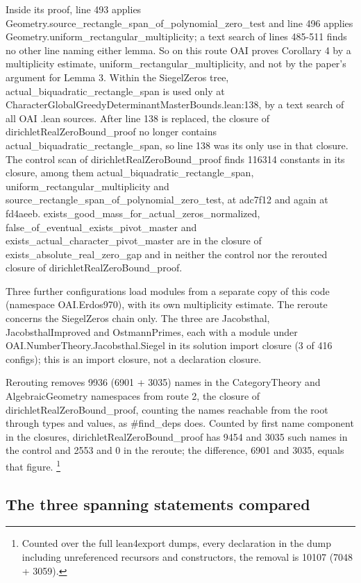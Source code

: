 Inside its proof, line 493 applies Geometry.source\_rectangle\_span\_of\_polynomial\_zero\_test and line 496 applies Geometry.uniform\_rectangular\_multiplicity; a text search of lines 485-511 finds no other line naming either lemma.
So on this route OAI proves Corollary 4 by a multiplicity estimate, uniform\_rectangular\_multiplicity, and not by the paper's argument for Lemma 3.
Within the SiegelZeros tree, actual\_biquadratic\_rectangle\_span is used only at CharacterGlobalGreedyDeterminantMasterBounds.lean:138, by a text search of all OAI .lean sources.
After line 138 is replaced, the closure of dirichletRealZeroBound\_proof no longer contains actual\_biquadratic\_rectangle\_span, so line 138 was its only use in that closure.
The control scan of dirichletRealZeroBound\_proof finds 116314 constants in its closure, among them actual\_biquadratic\_rectangle\_span, uniform\_rectangular\_multiplicity and source\_rectangle\_span\_of\_polynomial\_zero\_test, at adc7f12 and again at fd4aeeb.
exists\_good\_mass\_for\_actual\_zeros\_normalized, false\_of\_eventual\_exists\_pivot\_master and exists\_actual\_character\_pivot\_master are in the closure of exists\_absolute\_real\_zero\_gap and in neither the control nor the rerouted closure of dirichletRealZeroBound\_proof.

Three further configurations load modules from a separate copy of this code (namespace OAI.Erdos970), with its own multiplicity estimate.
The reroute concerns the SiegelZeros chain only.
The three are Jacobsthal, JacobsthalImproved and OstmannPrimes, each with a module under OAI.NumberTheory.Jacobsthal.Siegel in its solution import closure (3 of 416 configs); this is an import closure, not a declaration closure.

Rerouting removes 9936 (6901 + 3035) names in the CategoryTheory and AlgebraicGeometry namespaces from route 2, the closure of dirichletRealZeroBound\_proof, counting the names reachable from the root through types and values, as \#find\_deps does.
Counted by first name component in the closures, dirichletRealZeroBound\_proof has 9454 and 3035 such names in the control and 2553 and 0 in the reroute; the difference, 6901 and 3035, equals that figure.
\footnote{Counted over the full lean4export dumps, every declaration in the dump including unreferenced recursors and constructors, the removal is 10107 (7048 + 3059).
}

\subsection{The three spanning statements compared}

